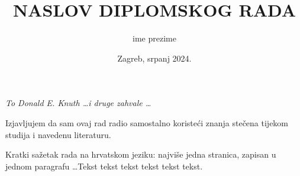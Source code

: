 \documentclass[a4paper,12pt]{report}
\title{NASLOV DIPLOMSKOG RADA}  %
\author{ime prezime}      %
\date{Zagreb, srpanj 2024.}      %
\begin{document}
%
%
\fsbkorice %
%
\fsbprvilist %
%
%
\begin{zahvala}
	\emph{To Donald E. Knuth \dots i druge zahvale \dots}
\end{zahvala}

\begin{izjava}
	Izjavljujem da sam ovaj rad radio samostalno koristeći znanja stečena
	tijekom studija i navedenu literaturu.
\end{izjava}

% 

\clearpage
\ifpdf
\fi
{}
\tableofcontents

%
\clearpage
\ifpdf
\fi
{}
\listoffigures

\clearpage
{}
\listoftables

%

\clearpage
\ifpdf
\fi
{}
\markboth{\MakeUppercase\nomname}{\MakeUppercase\nomname}
\printnomenclature

\clearpage
{}\addtocounter{brojstrana}{-1}

\begin{sazetak}
  \noindent Kratki sažetak rada na hrvatskom jeziku: najviše jedna
  stranica, zapisan u jednom paragrafu 
  \ldots Tekst tekst tekst tekst tekst tekst.
\end{sazetak}
\end{document}
